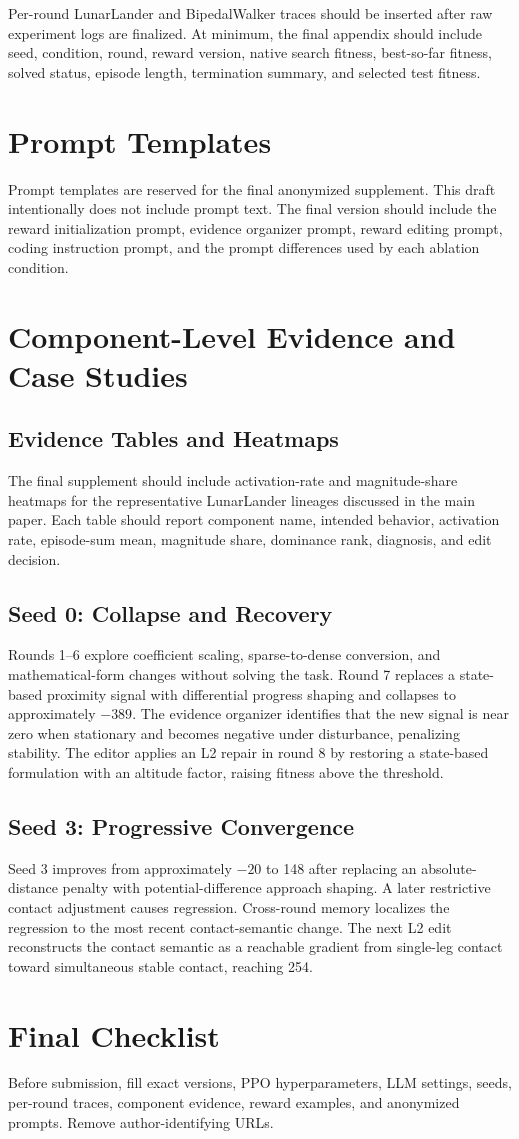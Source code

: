 \documentclass[10pt]{article}
\begin{document}
Per-round LunarLander and BipedalWalker traces should be inserted after raw experiment logs are finalized. At minimum, the final appendix should include seed, condition, round, reward version, native search fitness, best-so-far fitness, solved status, episode length, termination summary, and selected test fitness.

\section{Prompt Templates}
Prompt templates are reserved for the final anonymized supplement. This draft intentionally does not include prompt text. The final version should include the reward initialization prompt, evidence organizer prompt, reward editing prompt, coding instruction prompt, and the prompt differences used by each ablation condition.

\section{Component-Level Evidence and Case Studies}

\subsection{Evidence Tables and Heatmaps}
The final supplement should include activation-rate and magnitude-share heatmaps for the representative LunarLander lineages discussed in the main paper. Each table should report component name, intended behavior, activation rate, episode-sum mean, magnitude share, dominance rank, diagnosis, and edit decision.

\subsection{Seed 0: Collapse and Recovery}
Rounds 1--6 explore coefficient scaling, sparse-to-dense conversion, and mathematical-form changes without solving the task. Round 7 replaces a state-based proximity signal with differential progress shaping and collapses to approximately $-389$. The evidence organizer identifies that the new signal is near zero when stationary and becomes negative under disturbance, penalizing stability. The editor applies an L2 repair in round 8 by restoring a state-based formulation with an altitude factor, raising fitness above the threshold.

\subsection{Seed 3: Progressive Convergence}
Seed 3 improves from approximately $-20$ to 148 after replacing an absolute-distance penalty with potential-difference approach shaping. A later restrictive contact adjustment causes regression. Cross-round memory localizes the regression to the most recent contact-semantic change. The next L2 edit reconstructs the contact semantic as a reachable gradient from single-leg contact toward simultaneous stable contact, reaching 254.

\section{Final Checklist}
Before submission, fill exact versions, PPO hyperparameters, LLM settings, seeds, per-round traces, component evidence, reward examples, and anonymized prompts. Remove author-identifying URLs.
\end{document}
